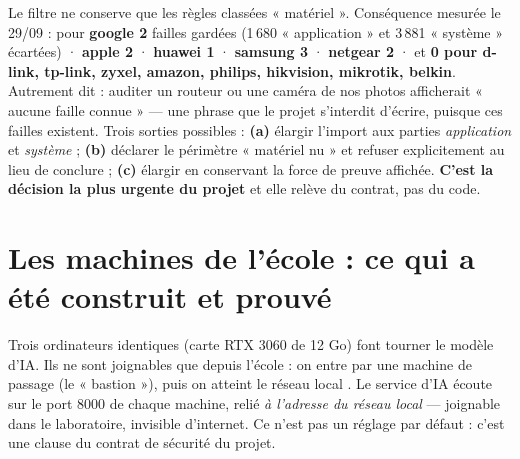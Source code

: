 \documentclass[10pt,a4paper]{article}
\providecommand{\NoAutoSpacing}{}
\newcommand{\code}[1]{{\NoAutoSpacing\ttfamily\detokenize{#1}}}
\begin{document}
\begin{atrancher}
{\footnotesize Le filtre ne conserve que les règles classées « matériel ». Conséquence mesurée le
29/09 : pour \textbf{google 2} failles gardées (1\,680 « application » et 3\,881 « système »
écartées) · \textbf{apple 2} · \textbf{huawei 1} · \textbf{samsung 3} · \textbf{netgear 2} · et
\textbf{0 pour d-link, tp-link, zyxel, amazon, philips, hikvision, mikrotik, belkin}. Autrement
dit : auditer un routeur ou une caméra de nos photos afficherait « aucune faille connue » — une
phrase que le projet s'interdit d'écrire, puisque ces failles existent. Trois sorties possibles :
\textbf{(a)} élargir l'import aux parties \emph{application} et \emph{système} ; \textbf{(b)}
déclarer le périmètre « matériel nu » et refuser explicitement au lieu de conclure ; \textbf{(c)}
élargir en conservant la force de preuve affichée. \textbf{C'est la décision la plus urgente du
projet} et elle relève du contrat, pas du code.}
\end{atrancher}

\section{Les machines de l'école : ce qui a été construit et prouvé}
Trois ordinateurs identiques (carte RTX 3060 de 12 Go) font tourner le modèle d'IA. Ils ne sont
joignables que depuis l'école : on entre par une machine de passage (le « bastion »), puis on
atteint le réseau local \code{172.26.145.x}. Le service d'IA écoute sur le port 8000 de chaque
machine, relié \emph{à l'adresse du réseau local} — joignable dans le laboratoire, invisible
d'internet. Ce n'est pas un réglage par défaut : c'est une clause du contrat de sécurité
du projet.
\end{document}
